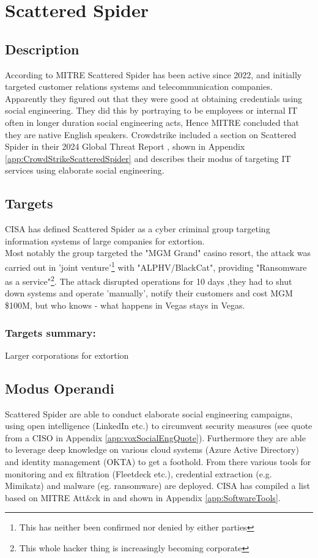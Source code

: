 \documentclass[
	letterpaper, %
	10pt, %
	unnumberedsections, %
	twoside, %
]{APAAssignment}
\begin{document}
\section{Scattered Spider}
\subsection{Description}
According to MITRE\cite{MITRE_ScatteredSpider} Scattered Spider has been active since 2022, and initially targeted customer relations systems and telecommunication companies. Apparently they figured out that they were good at obtaining credentials using social engineering. They did this by portraying to be employees or internal IT often in longer duration social engineering acts, Hence MITRE concluded that they are native English speakers. Crowdstrike included a section on Scattered Spider in their 2024 Global Threat Report \cite{CrowdStrikeGTR2024}, shown in Appendix \ref{app:CrowdStrikeScatteredSpider} and describes their modus of targeting IT services using elaborate social engineering.

\subsection{Targets}
CISA\cite{CISA_ScattetedSpider} has defined Scattered Spider as a cyber criminal group targeting information systems of large companies for extortion. \\
Most notably the group targeted the "MGM Grand" casino resort, the attack was carried out in 'joint venture'\footnote{This has neither been confirmed nor denied by either parties} with "ALPHV/BlackCat"\cite{UHonMGM-ALPHV}\cite{VOXonMGM-Hack}, providing "Ransomware as a service"\footnote{This whole hacker thing is increasingly becoming corporate}. The attack disrupted operations for 10 days ,they had to shut down systems and operate 'manually', notify their customers and cost MGM \$100M\cite{UHonMGM-ALPHV}, but who knows - what happens in Vegas stays in Vegas.

\subsubsection{Targets summary:} Larger corporations for extortion

\subsection{Modus Operandi}
Scattered Spider are able to conduct elaborate social engineering campaigns, using open intelligence (LinkedIn etc.) to circumvent security measures (see quote from a CISO in Appendix \ref{app:voxSocialEngQuote}). Furthermore they are able to leverage deep knowledge on various cloud systems (Azure Active Directory) and identity management (OKTA) to get a foothold. From there various tools for monitoring and ex filtration (Fleetdeck etc.), credential extraction (e.g. Mimikatz) and malware (eg. ransomware) are deployed. CISA has compiled a list based on MITRE Att\&ck in \cite{CISA_ScattetedSpider} and shown in Appendix \ref{app:SoftwareTools}. \\
\end{document}
